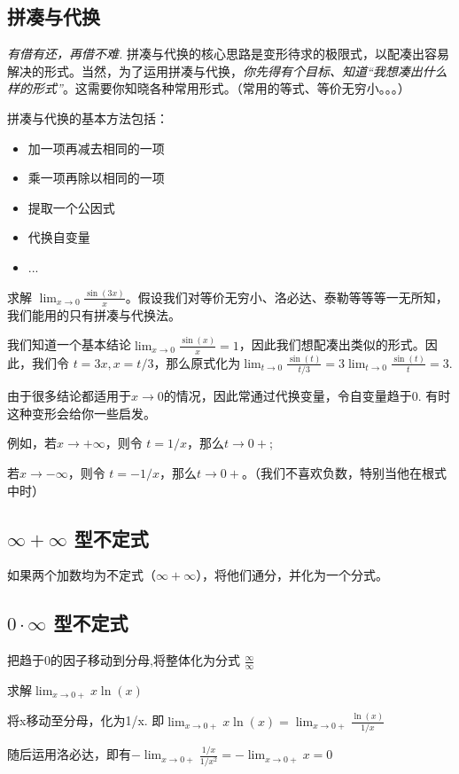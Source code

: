 \subsection{拼凑与代换}
\textsl{有借有还，再借不难.} 拼凑与代换的核心思路是变形待求的极限式，以配凑出容易解决的形式。当然，为了运用拼凑与代换，\textsl{你先得有个目标、知道“我想凑出什么样的形式”}。这需要你知晓各种常用形式。（常用的等式、等价无穷小。。。）

拼凑与代换的基本方法包括：
\begin{itemize}
\item 加一项再减去相同的一项
\item 乘一项再除以相同的一项
\item 提取一个公因式
\item 代换自变量
\item ...
\end{itemize}

\begin{example}{}
求解 $\lim_{x \to 0} \frac{\sin(3x)}{x}$。假设我们对等价无穷小、洛必达、泰勒等等等一无所知，我们能用的只有拼凑与代换法。

我们知道一个基本结论$\lim_{x \to 0} \frac{\sin(x)}{x}=1$，因此我们想配凑出类似的形式。因此，我们令 $t=3x, x=t/3$，那么原式化为$\lim_{t \to 0} \frac{\sin(t)}{t/3}=3\lim_{t \to 0} \frac{\sin(t)}{t}=3$.
\end{example}

\begin{example}{}
由于很多结论都适用于$x\to0$的情况，因此常通过代换变量，令自变量趋于0. 有时这种变形会给你一些启发。

例如，若$x\to+\infty$，则令 $t=1/x$，那么$t\to0+$; 

若$x\to-\infty$，则令 $t=-1/x$，那么$t\to0+$。（我们不喜欢负数，特别当他在根式中时）
\end{example}

\subsection{$\infty+\infty$ 型不定式}
如果两个加数均为不定式（$\infty+\infty$），将他们通分，并化为一个分式。

\subsection{$0\cdot\infty$ 型不定式}
把趋于0的因子移动到分母,将整体化为分式 $\frac{\infty}{\infty}$
\begin{example}{}
求解$\lim_{x\to0+} x\ln(x)$

将x移动至分母，化为1/x. 即$\lim_{x\to0+} x\ln(x)=\lim_{x\to0+} \frac{\ln(x)}{1/x}$

随后运用洛必达，即有$-\lim_{x\to0+} \frac{1/x}{1/x^2}=-\lim_{x\to0+} x=0$
\end{example}


